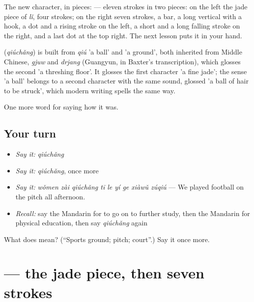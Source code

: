 The new character, in pieces:  — eleven strokes in two pieces: on the left the jade piece of  \emph{lǐ}, four strokes; on the right seven strokes, a bar, a long vertical with a hook, a dot and a rising stroke on the left, a short and a long falling stroke on the right, and a last dot at the top right. The next lesson puts it in your hand.

\begin{cousinweb}
\textbf{} (\emph{qiúchǎng}) is built from \emph{qiú} 'a ball' and  'a ground', both inherited from Middle Chinese, \emph{gjuw} and \emph{drjang} (Guangyun, in Baxter's transcription), which glosses the second 'a threshing floor'. It glosses the first character 'a fine jade'; the sense 'a ball' belongs to a second character with the same sound, glossed 'a ball of hair to be struck', which modern writing spells the same way.
\end{cousinweb}

\begin{grammarlens}[title={What you've built}]
One more word for saying how it was.
\end{grammarlens}

\subsection*{Your turn}
\begin{itemize}
\raggedright
  \item \emph{Say it:} \emph{qiúchǎng}
  \item \emph{Say it:} \emph{qiúchǎng}, once more
  \item \emph{Say it:} \emph{wǒmen zài qiúchǎng tī le yí ge xiàwǔ zúqiú} — We played football on the pitch all afternoon.
  \item \emph{Recall:} say the Mandarin for to go on to further study, then the Mandarin for physical education, then say \emph{qiúchǎng} again
\end{itemize}

\begin{tcolorbox}[breakable,colback=teal!4,colframe=teal!35!black,title={Before you move on}]
What does  mean? (\textquotedblleft{}Sports ground; pitch; court\textquotedblright{}.) Say it once more.
\end{tcolorbox}
\section[\texorpdfstring{\zh{球} (qiú)}{球 (qiú)}]{ — the jade piece, then seven strokes}

